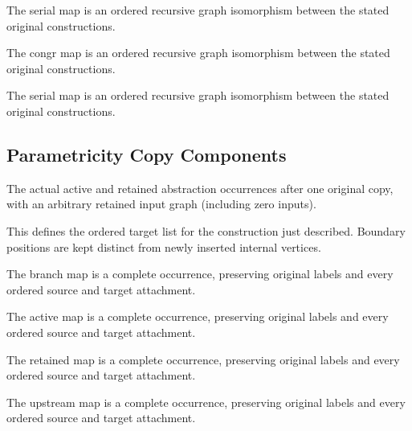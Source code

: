 The serial map is an ordered recursive graph isomorphism between the stated original constructions.
\par{}

The congr map is an ordered recursive graph isomorphism between the stated original constructions.
\par{}

The serial map is an ordered recursive graph isomorphism between the stated original constructions.
\par{}

\subsection{Parametricity Copy Components}
The actual active and retained abstraction occurrences after one original copy, with an arbitrary retained input graph (including zero inputs).

This defines the ordered target list for the construction just described. Boundary positions are kept distinct from newly inserted internal vertices.
\par{}

The branch map is a complete occurrence, preserving original labels and every ordered source and target attachment.
\par{}

The active map is a complete occurrence, preserving original labels and every ordered source and target attachment.
\par{}

The retained map is a complete occurrence, preserving original labels and every ordered source and target attachment.
\par{}

The upstream map is a complete occurrence, preserving original labels and every ordered source and target attachment.
\par{}

